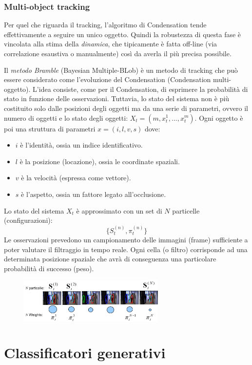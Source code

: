 \documentclass[a4paper,oneside,titlepage]{book}
\begin{document}
\subsection{Multi-object tracking}
Per quel che riguarda il tracking, l'algoritmo di Condensation tende effettivamente a seguire un unico oggetto. Quindi la robustezza di questa fase è vincolata alla stima della \textit{dinamica}, che tipicamente è fatta off-line (via correlazione esaustiva o manualmente) così da averla il più precisa possibile.

Il \textit{metodo Bramble} (Bayesian Multiple-BLob) è un metodo di tracking che può essere considerato come l'evoluzione del Condensation (Condensation multi-oggetto). L'idea consiste, come per il Condensation, di esprimere la probabilità di stato in funzione delle osservazioni. Tuttavia, lo stato del sistema non è più costituito solo dalle posizioni degli oggetti ma da una serie di parametri, ovvero il numero di oggetti e lo stato degli oggetti: $X_t = (m, x_t^1, ..., x_t^m)$. Ogni oggetto è poi una struttura di parametri $x=(i,l,v,s)$ dove:
\begin{itemize}
    \item $i$ è l'identità, ossia un indice identificativo.
    \item $l$ è la posizione (locazione), ossia le coordinate spaziali.
    \item $v$ è la velocità (espressa come vettore).
    \item $s$ è l'aspetto, ossia un fattore legato all'occlusione.
\end{itemize}
Lo stato del sistema $X_t$ è approssimato con un set di $N$ particelle (configurazioni):
\[ \{ S_t^{(n)}, \pi_t^{(n)} \} \]
Le osservazioni prevedono un campionamento delle immagini (frame) sufficiente a poter valutare il filtraggio in tempo reale. Ogni cella (o filtro) corrisponde ad una determinata posizione spaziale che avrà di conseguenza una particolare probabilità di successo (peso).
\begin{figure}[htp]
	\centering
	\includegraphics[width=0.65\textwidth]{bramble.png}
\end{figure}


\chapter{Classificatori generativi}
\end{document}
